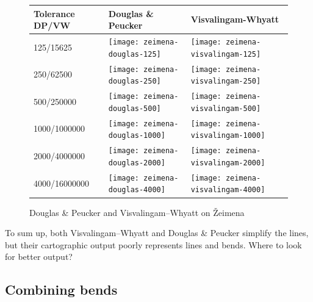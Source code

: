 \documentclass[a4paper]{article}
\newcommand{\DP}{Douglas \& Peucker}
\newcommand{\VW}{Visvalingam--Whyatt}
\begin{document}
\begin{figure}[H]
    \renewcommand{\tabularxcolumn}[1]{>{\center\small}m{#1}}
    \begin{tabularx}{\textwidth}{ p{2.1cm} | X | X | }
        Tolerance DP/VW                                                   &
        Douglas \& Peucker                                                &
        Visvalingam-Whyatt                                                \tabularnewline \hline

        125/15625                                                         &
        \texttt{[image: zeimena-douglas-125]}           &
        \texttt{[image: zeimena-visvalingam-125]}       \tabularnewline \hline

        250/62500                                                         &
        \texttt{[image: zeimena-douglas-250]}         &
        \texttt{[image: zeimena-visvalingam-250]}     \tabularnewline \hline

        500/250000                                                        &
        \texttt{[image: zeimena-douglas-500]}        &
        \texttt{[image: zeimena-visvalingam-500]}    \tabularnewline \hline

        1000/1000000                                                      &
        \texttt{[image: zeimena-douglas-1000]}      &
        \texttt{[image: zeimena-visvalingam-1000]}  \tabularnewline \hline

        2000/4000000                                                      &
        \texttt{[image: zeimena-douglas-2000]}     &
        \texttt{[image: zeimena-visvalingam-2000]} \tabularnewline \hline

        4000/16000000                                                     &
        \texttt{[image: zeimena-douglas-4000]}     &
        \texttt{[image: zeimena-visvalingam-4000]} \tabularnewline \hline
    \end{tabularx}
    \caption{{\DP} and {\VW} on Žeimena}
    \label{tab:comparison-zeimena}
\end{figure}


To sum up, both {\VW} and {\DP} simplify the lines, but their cartographic
output poorly represents lines and bends. Where to look for better output?

\subsection{Combining bends}
\end{document}
